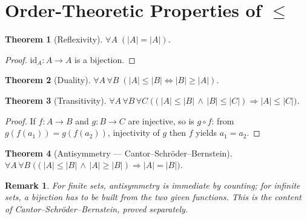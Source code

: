 \documentclass[11pt]{article}
\theoremstyle{defstyle}
\theoremstyle{thmstyle}
\newtheorem{theorem}{Theorem}[section]
\theoremstyle{notstyle}
\newtheorem*{remark}{Remark}
\theoremstyle{cautionstyle}
\newcommand{\card}[1]{\lvert #1 \rvert}
\begin{document}
\section{Order-Theoretic Properties of $\leq$}

\begin{thmbox}
\begin{theorem}[Reflexivity]
$\forall A \;(\card{A} = \card{A})$.
\end{theorem}
\end{thmbox}
\begin{proof}
$\mathrm{id}_A : A \to A$ is a bijection.
\end{proof}

\begin{thmbox}
\begin{theorem}[Duality]
$\forall A\, \forall B \;(\card{A} \leq \card{B} \iff \card{B} \geq \card{A})$.
\end{theorem}
\end{thmbox}

\begin{thmbox}
\begin{theorem}[Transitivity]
$\forall A\, \forall B\, \forall C \;\bigl((\card{A} \leq \card{B} \,\land\, \card{B} \leq \card{C}) \Rightarrow \card{A} \leq \card{C}\bigr)$.
\end{theorem}
\end{thmbox}
\begin{proof}
If $f : A \to B$ and $g : B \to C$ are injective, so is $g \circ f$: from
$g(f(a_1)) = g(f(a_2))$, injectivity of $g$ then $f$ yields $a_1 = a_2$.
\end{proof}

\begin{thmbox}
\begin{theorem}[Antisymmetry --- Cantor--Schr\"oder--Bernstein]
$\forall A\, \forall B \;\bigl((\card{A} \leq \card{B} \,\land\, \card{A} \geq \card{B}) \Rightarrow \card{A} = \card{B}\bigr)$.
\end{theorem}
\end{thmbox}

\begin{notebox}
\begin{remark}
For finite sets, antisymmetry is immediate by counting; for infinite sets, a
bijection has to be \emph{built} from the two given functions. This is the
content of Cantor--Schr\"oder--Bernstein, proved separately.
\end{remark}
\end{notebox}
\end{document}
